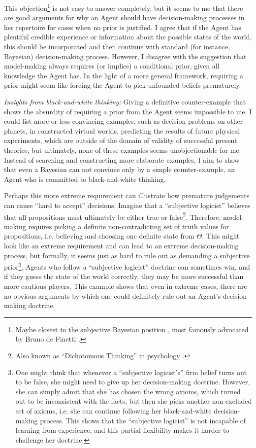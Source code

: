 \documentclass{article}
\begin{document}
This objection\footnote{Maybe closest to the subjective Bayesian position \cite{sep:BayesianEpistemology}, most famously advocated by Bruno de Finetti \cite{book:deFinetti}.} is not easy to answer completely, but it seems to me that there are good arguments for why an Agent should have decision-making processes in her repertoire for cases when no prior is justified.
I agree that if the Agent has plentiful credible experience or information about the possible states of the world, this should be incorporated and then continue with standard (for instance, Bayesian) decision-making process.
However, I disagree with the suggestion that model-making always requires (or implies) a conditional prior, given all knowledge the Agent has. In the light of a more general framework, requiring a prior might seem like forcing the Agent to pick unfounded beliefs prematurely.

{\it Insights from black-and-white thinking:}
Giving a definitive counter-example that shows the absurdity of requiring a prior from the Agent seems impossible to me. I could list more or less convincing examples, such as decision problems on other planets, in constructed virtual worlds, predicting the results of future physical experiments, which are outside of the domain of validity of successful present theories; but ultimately, none of these examples seems unobjectionable for me.
Instead of searching and constructing more elaborate examples, I aim to show that even a Bayesian can not convince only by a simple counter-example, an Agent who is committed to black-and-white thinking.

Perhaps this more extreme requirement can illustrate how premature judgements can cause ``hard to accept'' decisions:
Imagine that a ``subjective logicist'' believes that all propositions must ultimately be either true or false\footnote{Also known as ``Dichotomous Thinking'' in psychology \cite{book:DichotomousCBT}.}. Therefore, model-making requires picking a definite non-contradicting set of truth values for propositions, i.e. believing and choosing one definite state from $\Theta$.
This might look like an extreme requirement and can lead to an extreme decision-making process, but formally, it seems just as hard to rule out as demanding a subjective prior\footnote{
One might think that whenever a ``subjective logicist's'' firm belief turns out to be false, she might need to give up her decision-making doctrine.
However, she can simply admit that she has chosen the wrong axioms, which turned out to be inconsistent with the facts, but then she picks another non-excluded set of axioms, i.e. she can continue following her black-and-white decision-making process.
This shows that the ``subjective logicist'' is not incapable of learning from experience, and this partial flexibility makes it harder to challenge her doctrine.
}. Agents who follow a ``subjective logicist'' doctrine can sometimes win, and if they guess the state of the world correctly, they may be more successful than more cautious players.
This example shows that even in extreme cases, there are no obvious arguments by which one could definitely rule out an Agent's decision-making doctrine.
\end{document}
